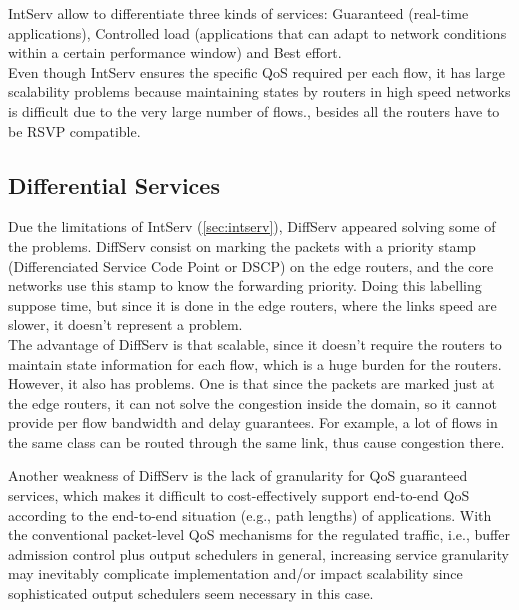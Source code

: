 IntServ allow to differentiate three kinds of services: Guaranteed (real-time applications), Controlled load (applications that can adapt to network conditions within a certain performance window) and Best effort.\\



Even though IntServ ensures the specific QoS required per each flow, it has large scalability problems because maintaining states by routers in high speed networks is difficult due to the very large number of flows., besides all the routers have to be RSVP compatible.   

\subsection{Differential Services}
\label{sec:diffserv}

Due the limitations of IntServ (\ref{sec:intserv}), DiffServ appeared solving some of the problems. DiffServ consist on marking the packets with a priority stamp (Differenciated Service Code Point or DSCP) on the edge routers, and the core networks use this stamp to know the forwarding priority. Doing this labelling suppose time, but since it is done in the edge routers, where the links speed are slower, it doesn't represent a problem.\\

The advantage of DiffServ is that scalable, since it doesn't require the routers to maintain state information for each flow, which is a huge burden for the routers. However, it also has problems. One is that since the packets are marked just at the edge routers, it can not solve the congestion inside the domain, so it cannot provide per flow bandwidth and delay guarantees. For example, a lot of flows in the same class can be routed through the same link, thus cause congestion there.

Another weakness of DiffServ is the lack of granularity for QoS guaranteed services, which makes it difficult to cost-effectively support end-to-end QoS according to the end-to-end situation (e.g., path lengths) of applications. With the conventional packet-level QoS mechanisms for the regulated traffic, i.e., buffer admission control plus output schedulers in general, increasing service granularity may inevitably complicate implementation and/or impact scalability since sophisticated output schedulers seem necessary in this case.


